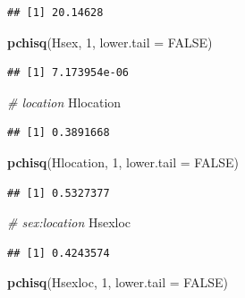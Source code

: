 \documentclass[
  12pt,
]{book}
\newenvironment{Shaded}{\begin{snugshade}}{\end{snugshade}}
\newcommand{\CommentTok}[1]{\textcolor[rgb]{0.56,0.35,0.01}{\textit{#1}}}
\newcommand{\DataTypeTok}[1]{\textcolor[rgb]{0.13,0.29,0.53}{#1}}
\newcommand{\DecValTok}[1]{\textcolor[rgb]{0.00,0.00,0.81}{#1}}
\newcommand{\KeywordTok}[1]{\textcolor[rgb]{0.13,0.29,0.53}{\textbf{#1}}}
\newcommand{\NormalTok}[1]{#1}
\newcommand{\OtherTok}[1]{\textcolor[rgb]{0.56,0.35,0.01}{#1}}
\begin{document}
\begin{verbatim}
## [1] 20.14628
\end{verbatim}

\begin{Shaded}
\begin{Highlighting}[]
\KeywordTok{pchisq}\NormalTok{(Hsex, }\DecValTok{1}\NormalTok{, }\DataTypeTok{lower.tail =} \OtherTok{FALSE}\NormalTok{)}
\end{Highlighting}
\end{Shaded}

\begin{verbatim}
## [1] 7.173954e-06
\end{verbatim}

\begin{Shaded}
\begin{Highlighting}[]
\CommentTok{\# location}
\NormalTok{Hlocation}
\end{Highlighting}
\end{Shaded}

\begin{verbatim}
## [1] 0.3891668
\end{verbatim}

\begin{Shaded}
\begin{Highlighting}[]
\KeywordTok{pchisq}\NormalTok{(Hlocation, }\DecValTok{1}\NormalTok{, }\DataTypeTok{lower.tail =} \OtherTok{FALSE}\NormalTok{)}
\end{Highlighting}
\end{Shaded}

\begin{verbatim}
## [1] 0.5327377
\end{verbatim}

\begin{Shaded}
\begin{Highlighting}[]
\CommentTok{\# sex:location}
\NormalTok{Hsexloc}
\end{Highlighting}
\end{Shaded}

\begin{verbatim}
## [1] 0.4243574
\end{verbatim}

\begin{Shaded}
\begin{Highlighting}[]
\KeywordTok{pchisq}\NormalTok{(Hsexloc, }\DecValTok{1}\NormalTok{, }\DataTypeTok{lower.tail =} \OtherTok{FALSE}\NormalTok{)}
\end{Highlighting}
\end{Shaded}
\end{document}
